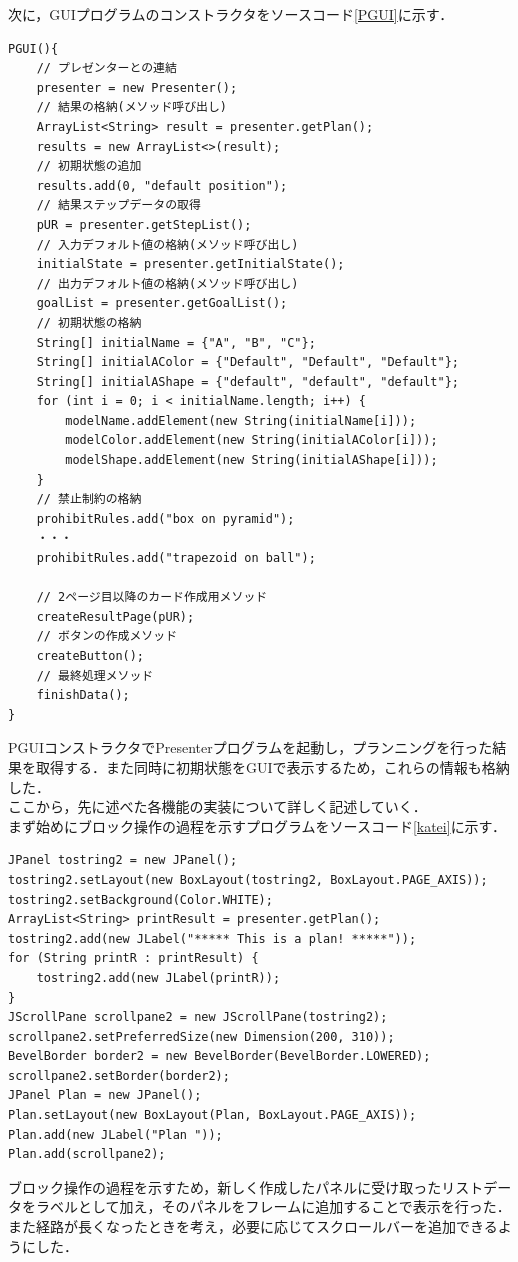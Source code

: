 \documentclass[uplatex,12pt]{jsarticle}
\begin{document}
次に，GUIプログラムのコンストラクタをソースコード\ref{PGUI}に示す．
\begin{lstlisting}[caption=コンストラクタ,label=PGUI]
PGUI(){
	// プレゼンターとの連結
	presenter = new Presenter();
	// 結果の格納(メソッド呼び出し)
	ArrayList<String> result = presenter.getPlan();
	results = new ArrayList<>(result);
	// 初期状態の追加
	results.add(0, "default position");
	// 結果ステップデータの取得
	pUR = presenter.getStepList();
	// 入力デフォルト値の格納(メソッド呼び出し)
	initialState = presenter.getInitialState();
	// 出力デフォルト値の格納(メソッド呼び出し)
	goalList = presenter.getGoalList();
	// 初期状態の格納
	String[] initialName = {"A", "B", "C"};
	String[] initialAColor = {"Default", "Default", "Default"};
	String[] initialAShape = {"default", "default", "default"};
	for (int i = 0; i < initialName.length; i++) {
		modelName.addElement(new String(initialName[i]));
		modelColor.addElement(new String(initialAColor[i]));
		modelShape.addElement(new String(initialAShape[i]));
	}
	// 禁止制約の格納
	prohibitRules.add("box on pyramid");
	・・・
	prohibitRules.add("trapezoid on ball");

	// 2ページ目以降のカード作成用メソッド
	createResultPage(pUR);
	// ボタンの作成メソッド
	createButton();
	// 最終処理メソッド
	finishData();
}
\end{lstlisting}
PGUIコンストラクタでPresenterプログラムを起動し，プランニングを行った結果を取得する．また同時に初期状態をGUIで表示するため，これらの情報も格納した．\\

ここから，先に述べた各機能の実装について詳しく記述していく．\\
まず始めにブロック操作の過程を示すプログラムをソースコード\ref{katei}に示す．
\begin{lstlisting}[caption=過程表示,label=katei]
JPanel tostring2 = new JPanel();
tostring2.setLayout(new BoxLayout(tostring2, BoxLayout.PAGE_AXIS));
tostring2.setBackground(Color.WHITE);
ArrayList<String> printResult = presenter.getPlan();
tostring2.add(new JLabel("***** This is a plan! *****"));
for (String printR : printResult) {
	tostring2.add(new JLabel(printR));
}
JScrollPane scrollpane2 = new JScrollPane(tostring2);
scrollpane2.setPreferredSize(new Dimension(200, 310));
BevelBorder border2 = new BevelBorder(BevelBorder.LOWERED);
scrollpane2.setBorder(border2);
JPanel Plan = new JPanel();
Plan.setLayout(new BoxLayout(Plan, BoxLayout.PAGE_AXIS));
Plan.add(new JLabel("Plan "));
Plan.add(scrollpane2);
\end{lstlisting}
ブロック操作の過程を示すため，新しく作成したパネルに受け取ったリストデータをラベルとして加え，そのパネルをフレームに追加することで表示を行った．また経路が長くなったときを考え，必要に応じてスクロールバーを追加できるようにした．\\
\end{document}
